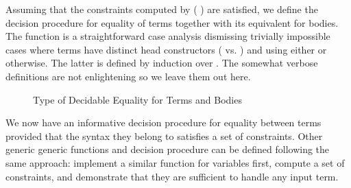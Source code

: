 Assuming that the constraints computed by {( )} are
satisfied, we define the decision procedure for equality of terms together
with its equivalent for bodies. The function 
is a straightforward case analysis dismissing trivially impossible cases
where terms have distinct head constructors ( vs. )
and using either  or 
otherwise. The latter is defined by induction over . The somewhat
verbose definitions are not enlightening so we leave them out here.


\begin{figure}[h]
\caption{Type of Decidable Equality for Terms and Bodies}\label{fig:eqtype}
\end{figure}

We now have an informative decision procedure for equality between terms
provided that the syntax they belong to satisfies a set of constraints.
Other generic generic functions and decision procedure can be defined
following the same approach: implement a similar function for variables
first, compute a set of constraints, and demonstrate that they are
sufficient to handle any input term.
